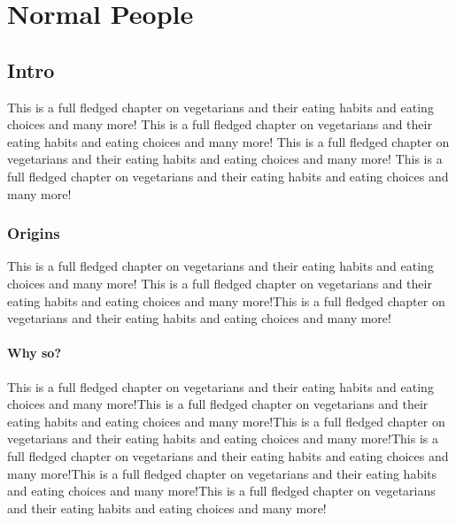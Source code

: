 \chapter{Normal People}

\section{Intro}
This is a full fledged chapter on vegetarians and their eating habits and eating choices and many more! This is a full fledged chapter on vegetarians and their eating habits and eating choices and many more! This is a full fledged chapter on vegetarians and their eating habits and eating choices and many more! This is a full fledged chapter on vegetarians and their eating habits and eating choices and many more!
\subsection{Origins} This is a full fledged chapter on vegetarians and their eating habits and eating choices and many more! This is a full fledged chapter on vegetarians and their eating habits and eating choices and many more!This is a full fledged chapter on vegetarians and their eating habits and eating choices and many more!

\subsubsection{Why so?}

This is a full fledged chapter on vegetarians and their eating habits and eating choices and many more!This is a full fledged chapter on vegetarians and their eating habits and eating choices and many more!This is a full fledged chapter on vegetarians and their eating habits and eating choices and many more!This is a full fledged chapter on vegetarians and their eating habits and eating choices and many more!This is a full fledged chapter on vegetarians and their eating habits and eating choices and many more!This is a full fledged chapter on vegetarians and their eating habits and eating choices and many more!
